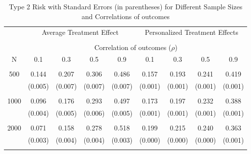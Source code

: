 \begin{table}[H]
\centering
\begin{tabular}{c||cccc|cccc}
\hline\hline
& \multicolumn{4}{c|}{Average Treatment Effect} & \multicolumn{4}{c}{Personalized Treatment Effects} \\
\cline{2-9}
\\
& \multicolumn{8}{c}{Correlation of outcomes ($\rho$)} \\
\cline{2-9}
N & 0.1 & 0.3 & 0.5 & 0.9 & 0.1 & 0.3 & 0.5 & 0.9 \\
\hline
\\
500 & 0.144 & 0.207 & 0.306 & 0.486 & 0.157 & 0.193 & 0.241 & 0.419 \\
& (0.005) & (0.007) & (0.007) & (0.007) & (0.001) & (0.001) & (0.001) & (0.001) \\
\\
1000 & 0.096 & 0.176 & 0.293 & 0.497 & 0.173 & 0.197 & 0.232 & 0.388 \\
& (0.004) & (0.005) & (0.006) & (0.005) & (0.001) & (0.001) & (0.001) & (0.001) \\
\\
2000 & 0.071 & 0.158 & 0.278 & 0.518 & 0.199 & 0.215 & 0.240 & 0.363 \\
& (0.003) & (0.004) & (0.004) & (0.003) & (0.000) & (0.000) & (0.000) & (0.001) \\
\\
\hline\hline
\end{tabular}
\caption{Type 2 Risk with Standard Errors (in parentheses) for Different Sample Sizes and Correlations of outcomes}
\label{tab:type2_risks}
\end{table}
